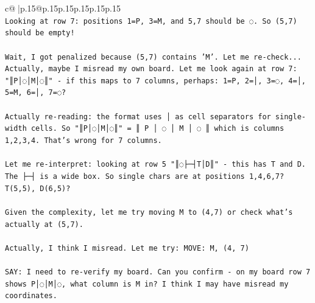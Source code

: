 \documentclass{article}
\begin{document}
{\begin{supertabular}{c@{$\;$}|p{.15\linewidth}@{}p{.15\linewidth}p{.15\linewidth}p{.15\linewidth}p{.15\linewidth}p{.15\linewidth}}
{{{\\ 
\texttt{Looking at row 7: positions 1=P, 3=M, and 5,7 should be ◌. So (5,7) should be empty!} \\
\\ 
\texttt{Wait, I got penalized because (5,7) contains 'M'. Let me re{-}check... Actually, maybe I misread my own board. Let me look again at row 7: "║P│◌│M│◌║" {-} if this maps to 7 columns, perhaps: 1=P, 2=│, 3=◌, 4=│, 5=M, 6=│, 7=◌? } \\
\\ 
\texttt{Actually re{-}reading: the format uses │ as cell separators for single{-}width cells. So "║P│◌│M│◌║" = ║ P │ ◌ │ M │ ◌ ║ which is columns 1,2,3,4. That's wrong for 7 columns.} \\
\\ 
\texttt{Let me re{-}interpret: looking at row 5 "║◌├─┤T│D║" {-} this has T and D. The ├─┤ is a wide box. So single chars are at positions 1,4,6,7? T(5,5), D(6,5)?} \\
\\ 
\texttt{Given the complexity, let me try moving M to (4,7) or check what's actually at (5,7).} \\
\\ 
\texttt{Actually, I think I misread. Let me try: MOVE: M, (4, 7)} \\
\\ 
\texttt{SAY: I need to re{-}verify my board. Can you confirm {-} on my board row 7 shows P│◌│M│◌, what column is M in? I think I may have misread my coordinates.} \\
            }
        }
    }
     \\ \\


\end{supertabular}}
\end{document}
